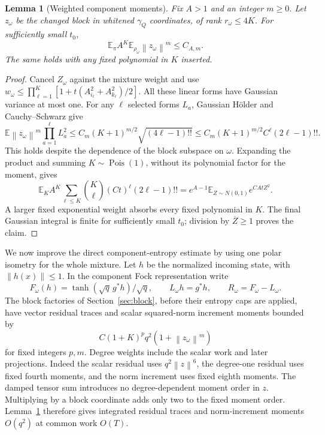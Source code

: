 \documentclass[11pt]{article}
\newtheorem{lemma}[theorem]{Lemma}
\newcommand{\E}{\mathbb E}
\newcommand{\norm}[1]{\left\lVert #1\right\rVert}
\begin{document}
\begin{lemma}[Weighted component moments]
\label{lem:normalizedmoments}
Fix $A>1$ and an integer $m\ge0$. Let $z_\omega$ be the changed block in whitened $\gamma_Q$ coordinates, of rank $r_\omega\le4K$. For sufficiently small $t_0$,
\[
 \E_\pi A^K\E_{\rho_\omega}\norm{z_\omega}^m\le C_{A,m}.
\]
The same holds with any fixed polynomial in $K$ inserted.
\end{lemma}
\begin{proof}
Cancel $Z_\omega$ against the mixture weight and use
$w_\omega\le\prod_{\ell=1}^K[1+t(A_{i_\ell}^2+A_{k_\ell}^2)/2]$.
All these linear forms have Gaussian variance at most one. For any $\ell$ selected forms $L_a$, Gaussian H\"older and Cauchy--Schwarz give
\[
 \E\norm{z_\omega}^m\prod_{a=1}^{\ell}L_a^2
 \le C_m(K+1)^{m/2}\sqrt{(4\ell-1)!!}
 \le C_m(K+1)^{m/2}C^\ell(2\ell-1)!!.
\]
This holds despite the dependence of the block subspace on $\omega$. Expanding the product and summing $K\sim\operatorname{Pois}(1)$, without its polynomial factor for the moment, gives
\[
 \E_K A^K\sum_{\ell\le K}\binom K\ell(Ct)^\ell(2\ell-1)!!
 =e^{A-1}\E_{Z\sim N(0,1)}e^{CAtZ^2}.
\]
A larger fixed exponential weight absorbs every fixed polynomial in $K$. The final Gaussian integral is finite for sufficiently small $t_0$; division by $\overline Z\ge1$ proves the claim.
\end{proof}

We now improve the direct component-entropy estimate by using one polar isometry for the whole mixture. Let $h$ be the normalized incoming state, with $\norm{h(x)}\le1$. In the component Fock representation write
\[
 F_\omega(h)=\tanh(\sqrt q\,g^*h)/\sqrt q,\qquad
 L_\omega h=g^*h,\qquad R_\omega=F_\omega-L_\omega.
\]
The block factories of Section~\ref{sec:block}, before their entropy caps are applied, have vector residual traces and scalar squared-norm increment moments bounded by
\begin{equation}
 C(1+K)^p q^2(1+\norm{z_\omega}^m)
 \label{eq:rawblockmoment}
\end{equation}
for fixed integers $p,m$. Degree weights include the scalar work and later projections. Indeed the scalar residual uses $q^2\norm z^6$, the degree-one residual uses fixed fourth moments, and the norm increment uses fixed eighth moments. The damped tensor sum introduces no degree-dependent moment order in $z$. Multiplying by a block coordinate adds only two to the fixed moment order. Lemma~\ref{lem:normalizedmoments} therefore gives integrated residual traces and norm-increment moments $O(q^2)$ at common work $O(T)$.
\end{document}

